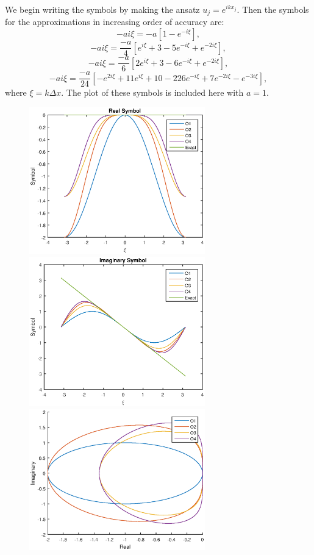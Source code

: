 We begin writing the symbols by making the ansatz $u_j=e^{ikx_j}.$ Then the symbols for the approximations in increasing order of accuracy are:
$$-ai\xi=-a[1-e^{-i\xi}],$$
$$-ai\xi=\frac{-a}{4}[e^{i\xi}+3-5e^{-i\xi}+e^{-2i\xi}],$$
$$-ai\xi=\frac{-a}{6}[2e^{i\xi}+3-6e^{-i\xi}+e^{-2i\xi}],$$
$$-ai\xi=\frac{-a}{24}[-e^{2i\xi}+11e^{i\xi}+10-226e^{-i\xi}+7e^{-2i\xi}-e^{-3i\xi}],$$
where $\xi=k\Delta x.$ The plot of these symbols is included here with $a=1.$
\begin{figure}[h]
\centering
\includegraphics[width=3in]{realsym}
\includegraphics[width=3in]{imsym}\\
\includegraphics[width=3in]{sym}
\end{figure}

